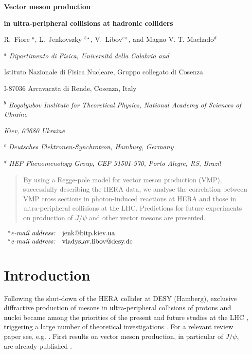 \documentclass[12pt]{article}
\begin{document}
\vskip 0.5cm \centerline{\bf\Large Vector meson production}
\centerline{\bf\Large in ultra-peripheral collisions at hadronic colliders}  \vskip 0.3cm
\centerline{R.~Fiore $^a$, L.~Jenkovszky $^{b\star}$, V.~Libov$^{c\diamond}$, and Magno V. T. Machado$^d$}

\vskip 1cm

\centerline{$^a$ \sl Dipartimento di Fisica, Universit\'a della Calabria and}
\centerline{Istituto Nazionale di Fisica Nucleare, Gruppo collegato di Cosenza}
\centerline{I-87036 Arcavacata di Rende, Cosenza, Italy}
\centerline{$^b$ \sl Bogolyubov Institute for Theoretical Physics,
National Academy of Sciences of Ukraine} \centerline{\sl Kiev,
03680 Ukraine}
\centerline{$^c$ \sl Deutsches Elektronen-Synchrotron, Hamburg, Germany}
\centerline{$^d$ \sl HEP Phenomenology Group, CEP 91501-970, Porto Alegre, RS, Brazil}
\vskip
0.1cm

\begin{abstract}\noindent
By using a Regge-pole model for vector meson production (VMP), successfully describing the HERA data, we analyse the correlation between VMP cross sections in photon-induced reactions at HERA and those in ultra-peripheral collisions at the LHC.
Predictions for future experiments on production of $J/\psi$ and other vector mesons are presented.
\end{abstract}

\vskip 0.1cm

$
\begin{array}{ll}

^{\star}\mbox{{\it e-mail address:}} &
   \mbox{jenk@bitp.kiev.ua} \\
^{\diamond}\mbox{{\it e-mail address:}} &
   \mbox{vladyslav.libov@desy.de} \\

\end{array}
$


\section{Introduction}\label{Int}

Following the shut-down of the HERA collider at DESY (Hamberg), exclusive diffractive production of mesons in ultra-peripheral collisions of protons and nuclei became among the priorities of the present and future studies at the LHC \cite{LHCb1, LHCb2}, triggering a large number of theoretical investigations \cite{Schafer, Brazil, Ryskin, Motyka, Szczurek}.
For a relevant review paper see, e.g. \cite{Review}.
First results on vector meson production, in particular of $J/\psi$, are already published \cite{LHCb1, LHCb2}.
\end{document}
